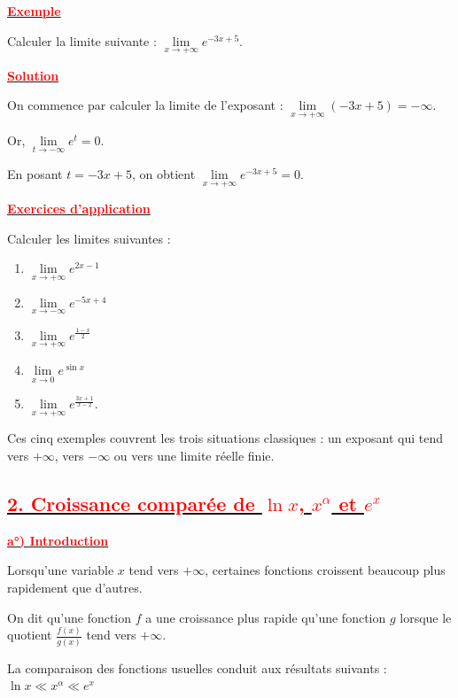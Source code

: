 \documentclass[12pt,a4paper]{article}
\newcounter{exemple}
\begin{document}
\underline{\textbf{\textcolor{red}{Exemple}}}

Calculer la limite suivante :
\(
\lim\limits_{x\to+\infty}e^{-3x+5}.
\)

\underline{\textbf{\textcolor{red}{Solution}}}

On commence par calculer la limite de l'exposant :
\(
\lim\limits_{x\to+\infty}(-3x+5)=-\infty.
\)

Or,
\(
\lim\limits_{t\to-\infty}e^t=0.
\)

En posant \(t=-3x+5\), on obtient
\(
\boxed{\lim\limits_{x\to+\infty}e^{-3x+5}=0.}
\)

\underline{\textbf{\textcolor{red}{ Exercices d'application }}}

Calculer les limites suivantes :

\begin{enumerate}
\item \(
\lim\limits_{x\to+\infty}e^{2x-1}
\)

\item
\(
\lim\limits_{x\to-\infty}e^{-5x+4}
\)

\item
\(
\lim\limits_{x\to+\infty}e^{\frac{1-x}{2}}
\)

\item
\(
\lim\limits_{x\to0}e^{\sin x}
\)

\item
\(
\lim\limits_{x\to+\infty}e^{\frac{3x+1}{x-2}}.
\)
\end{enumerate}

Ces cinq exemples couvrent les trois situations classiques : un exposant qui tend vers \(+\infty\), vers \(-\infty\) ou vers une limite réelle finie.

\subsection*{\underline{\textbf{\textcolor{red}{2. Croissance comparée de \(\ln x\), \(x^\alpha\) et \(e^x\)}}}}

\underline{\textbf{\textcolor{red}{a°) Introduction}}}

Lorsqu'une variable \(x\) tend vers \(+\infty\), certaines fonctions
croissent beaucoup plus rapidement que d'autres.

On dit qu'une fonction \(f\) a une croissance plus rapide qu'une fonction
\(g\) lorsque le quotient \(\frac{f(x)}{g(x)}\) tend vers \(+\infty\).

La comparaison des fonctions usuelles conduit aux résultats suivants :
\(
\ln x \ll x^\alpha \ll e^x
\)
\end{document}
